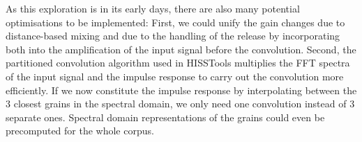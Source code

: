 As this exploration is in its early days, there are also many potential optimisations to be implemented:
%
First, we could unify the gain changes due to distance-based mixing and due to the handling of the release by incorporating both into the amplification of the input signal before the convolution.
%
Second, the partitioned convolution algorithm used in HISSTools multiplies the FFT spectra of the input signal and the impulse response to carry out the convolution more efficiently.  If we now constitute the impulse response by interpolating between the 3 closest grains in the spectral domain, we only need one convolution instead of 3 separate ones.  Spectral domain representations of the grains could even be precomputed for the whole corpus. %



